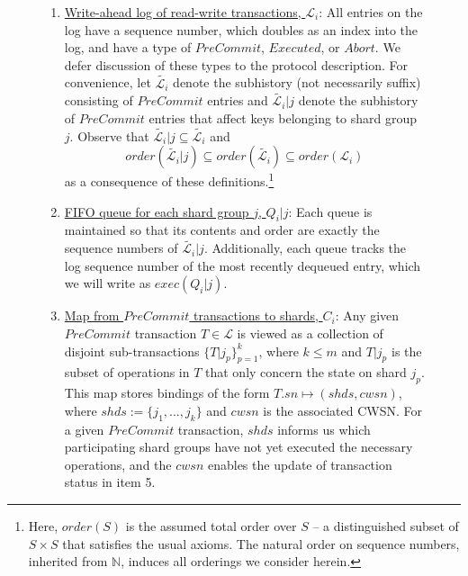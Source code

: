\documentclass{article}
\begin{document}
\begin{figure}[H]
  \vspace*{-2.5em}
  \centering  
\begin{tcolorbox}[title= On \textbf{transaction manager node} $i$, enhanced, width=1.05\textwidth, left skip=-0.5cm, colback=black!4!white]  
\begin{enumerate}[itemsep=1pt]
\item \underline{Write-ahead log of read-write transactions, $\mathcal{L}_i$}: All entries on the log have a sequence number, which doubles as an index into the log, and have a type of $PreCommit$, $Executed$, or $Abort$. We defer discussion of these types to the protocol description. For convenience, let $\tilde{\mathcal{L}_i}$ denote the subhistory (not necessarily suffix) consisting of $PreCommit$ entries and $\tilde{\mathcal{L}_i}|j$ denote the subhistory of $PreCommit$ entries that affect keys belonging to shard group $j$. Observe that $\tilde{\mathcal{L}_i}|j \subseteq \tilde{\mathcal{L}_i}$ and  \begin{equation*}
    order\left(\tilde{\mathcal{L}_i}|j \right) \subseteq order\left(\tilde{\mathcal{L}_i} \right)\subseteq order(\mathcal{L}_i)
  \end{equation*}
  as a consequence of these definitions.\footnote{Here, $order(S)$ is the assumed total order over $S$ -- a distinguished subset of $S \times S$ that satisfies the usual axioms. The natural order on sequence numbers, inherited from $\mathbb{N}$, induces all orderings we consider herein.}
\item \underline{FIFO queue for each shard group $j$, $Q_i|j$}: Each queue is maintained so that its contents and order are exactly the sequence numbers of $\tilde{\mathcal{L}_i}|j$. Additionally, each queue tracks the log sequence number of the most recently dequeued entry, which we will write as $exec(Q_i|j)$.
\item \underline{Map from $PreCommit$ transactions to shards, $C_i$}: Any given $PreCommit$ transaction $T \in \mathcal{L}$ is viewed as a collection of disjoint sub-transactions $\{T|j_p\}_{p=1}^k$, where $k \leq m$ and $T|j_p$ is the subset of operations in $T$ that only concern the state on shard $j_p$. This map stores bindings of the form $T.sn \mapsto (shds, cwsn)$, where $shds  :=\{j_1,...,j_k\}$ and $cwsn$ is the associated CWSN. For a given $PreCommit$ transaction, $shds$ informs us which participating shard groups have not yet executed the necessary operations, and the $cwsn$ enables the update of transaction status in item 5. 

\end{enumerate}
\end{tcolorbox}
\end{figure}
\end{document}

